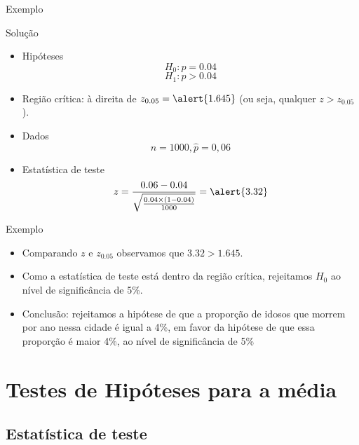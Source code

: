 \documentclass{beamer}
\begin{document}
\begin{frame}{Exemplo}
  \begin{block}{Solução}
    \begin{itemize}
    \item Hipóteses
      \begin{displaymath}
        H_0: p=0.04
      \end{displaymath}
      \begin{displaymath}
        H_1: p>0.04
      \end{displaymath}
    \item Região crítica: à direita de $z_{0.05} = \alert{1.645}$ (ou seja,
      qualquer $z>z_{0.05}$).
    \item Dados
      \begin{displaymath}
        n=1000, \hat{p} = 0,06
      \end{displaymath}
    \item Estatística de teste
      \begin{displaymath}
        z = \frac{0.06 - 0.04}{\sqrt{\frac{0.04 \times (1-0.04)}{1000}}} = \alert{3.32}
      \end{displaymath}
    \end{itemize}
  \end{block}
\end{frame}

\begin{frame}{Exemplo}
  \begin{itemize}
  \item Comparando $z$ e $z_{0.05}$ observamos que $3.32>1.645$.
  \item Como a estatística de teste está dentro da região crítica,
    rejeitamos $H_0$ ao nível de significância de 5\%.
  \item Conclusão: rejeitamos a hipótese de que a proporção de idosos
    que morrem por ano nessa cidade é igual a 4\%, em favor da
    hipótese de que essa proporção é maior 4\%, ao nível de
    significância de 5\%
  \end{itemize}
\end{frame}

\section{Testes de Hipóteses para a média}

\subsection{Estatística de teste}
\end{document}
